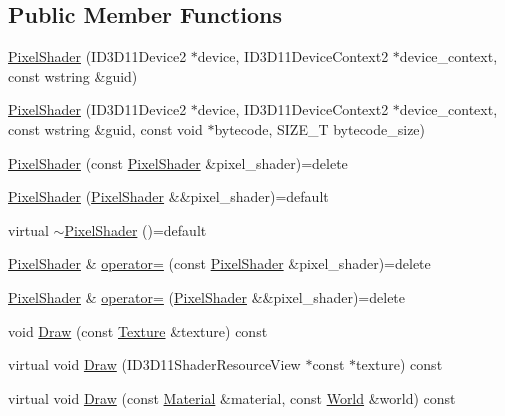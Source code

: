 \subsection*{Public Member Functions}
\begin{DoxyCompactItemize}
\item 
\hyperlink{classmage_1_1_pixel_shader_abf1a5e4a5a550553aea1427e80cd9403}{Pixel\+Shader} (I\+D3\+D11\+Device2 $\ast$device, I\+D3\+D11\+Device\+Context2 $\ast$device\+\_\+context, const wstring \&guid)
\item 
\hyperlink{classmage_1_1_pixel_shader_a0278c67883cbf9259ea83e7f6c8162a2}{Pixel\+Shader} (I\+D3\+D11\+Device2 $\ast$device, I\+D3\+D11\+Device\+Context2 $\ast$device\+\_\+context, const wstring \&guid, const void $\ast$bytecode, S\+I\+Z\+E\+\_\+T bytecode\+\_\+size)
\item 
\hyperlink{classmage_1_1_pixel_shader_a361df943e40e9015ac4b769af130ce79}{Pixel\+Shader} (const \hyperlink{classmage_1_1_pixel_shader}{Pixel\+Shader} \&pixel\+\_\+shader)=delete
\item 
\hyperlink{classmage_1_1_pixel_shader_a5adc11fbc9b644b38cb9f6e5c7974a90}{Pixel\+Shader} (\hyperlink{classmage_1_1_pixel_shader}{Pixel\+Shader} \&\&pixel\+\_\+shader)=default
\item 
virtual \hyperlink{classmage_1_1_pixel_shader_ac339b9196db24d18143ad36013d598b2}{$\sim$\+Pixel\+Shader} ()=default
\item 
\hyperlink{classmage_1_1_pixel_shader}{Pixel\+Shader} \& \hyperlink{classmage_1_1_pixel_shader_ac3a3535b2751237f4aad110dca05d0c3}{operator=} (const \hyperlink{classmage_1_1_pixel_shader}{Pixel\+Shader} \&pixel\+\_\+shader)=delete
\item 
\hyperlink{classmage_1_1_pixel_shader}{Pixel\+Shader} \& \hyperlink{classmage_1_1_pixel_shader_aaeab6f6fda7d6e1f7d333da03d58daf9}{operator=} (\hyperlink{classmage_1_1_pixel_shader}{Pixel\+Shader} \&\&pixel\+\_\+shader)=delete
\item 
void \hyperlink{classmage_1_1_pixel_shader_acff36b2ae6500b720a54a5d41efcc3fe}{Draw} (const \hyperlink{classmage_1_1_texture}{Texture} \&texture) const
\item 
virtual void \hyperlink{classmage_1_1_pixel_shader_ac9d71d866f79e155db729d8890b9ca78}{Draw} (I\+D3\+D11\+Shader\+Resource\+View $\ast$const $\ast$texture) const
\item 
virtual void \hyperlink{classmage_1_1_pixel_shader_ac0506a453bf814b32aeb00819ec05806}{Draw} (const \hyperlink{structmage_1_1_material}{Material} \&material, const \hyperlink{classmage_1_1_world}{World} \&world) const
\end{DoxyCompactItemize}
